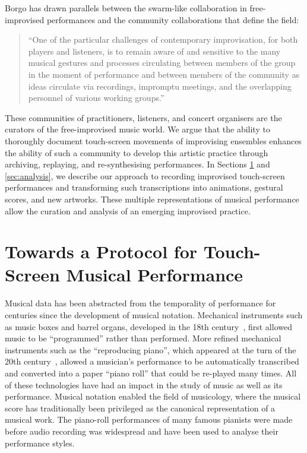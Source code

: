 \documentclass[graybox]{svmult}
\begin{document}
Borgo has drawn parallels between the swarm-like collaboration in
free-improvised performances and the community collaborations that
define the field: 
\begin{quote}
``One of the particular challenges of contemporary
improvisation, for both players and listeners, is to remain aware of
and sensitive to the many musical gestures and processes circulating
between members of the group in the moment of performance and between
members of the community as ideas circulate via recordings, impromptu
meetings, and the overlapping personnel of various working
groups.''~\cite{Borgo:2006fv} 
\end{quote}
These communities of practitioners, listeners, and concert organisers
are the curators of the free-improvised music world. We argue that the
ability to thoroughly document touch-screen movements of improvising
ensembles enhances the ability of such a community to develop this
artistic practice through archiving, replaying, and re-synthesising
performances. In Sections \ref{sec:protocols} and \ref{sec:analysis},
we describe our approach to recording improvised touch-screen
performances and transforming such transcriptions into animations,
gestural scores, and new artworks. These multiple representations of
musical performance allow the curation and analysis of an emerging
improvised practice.

\section{Towards a Protocol for Touch-Screen Musical Performance}
\label{sec:protocols}

Musical data has been abstracted from the temporality of performance
for centuries since the development of musical notation. Mechanical
instruments such as music boxes and barrel organs, developed in the
18th century~\cite{Fowler:1967kq}, first allowed music to be
``programmed'' rather than performed. More refined mechanical
instruments such as the ``reproducing piano'', which appeared at the
turn of the 20th century~\cite{Kapur:2005fk}, allowed a musician's
performance to be automatically transcribed and converted into a paper
``piano roll'' that could be re-played many times. All of these
technologies have had an impact in the study of music as well as its
performance. Musical notation enabled the field of musicology, where
the musical score has traditionally been privileged as the canonical
representation of a musical work. The piano-roll performances of many
famous pianists were made before audio recording was widespread and
have been used to analyse their performance styles.
\end{document}
